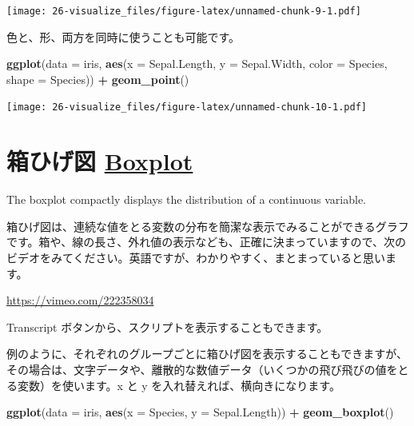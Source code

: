 \documentclass[
  xelatex, ja=standard]{bxjsbook}
\newenvironment{Shaded}{\begin{snugshade}}{\end{snugshade}}
\newcommand{\AttributeTok}[1]{\textcolor[rgb]{0.13,0.29,0.53}{#1}}
\newcommand{\FunctionTok}[1]{\textcolor[rgb]{0.13,0.29,0.53}{\textbf{#1}}}
\newcommand{\NormalTok}[1]{#1}
\newcommand{\SpecialCharTok}[1]{\textcolor[rgb]{0.81,0.36,0.00}{\textbf{#1}}}
\theoremstyle{definition}
\theoremstyle{definition}
\theoremstyle{definition}
\theoremstyle{definition}
\theoremstyle{remark}
\begin{document}
\texttt{[image: 26-visualize\_files/figure-latex/unnamed-chunk-9-1.pdf]}

色と、形、両方を同時に使うことも可能です。

\begin{Shaded}
\begin{Highlighting}[]
\FunctionTok{ggplot}\NormalTok{(}\AttributeTok{data =}\NormalTok{ iris, }\FunctionTok{aes}\NormalTok{(}\AttributeTok{x =}\NormalTok{ Sepal.Length, }\AttributeTok{y =}\NormalTok{ Sepal.Width, }\AttributeTok{color =}\NormalTok{ Species, }\AttributeTok{shape =}\NormalTok{ Species)) }\SpecialCharTok{+}
  \FunctionTok{geom\_point}\NormalTok{()}
\end{Highlighting}
\end{Shaded}

\texttt{[image: 26-visualize\_files/figure-latex/unnamed-chunk-10-1.pdf]}

\hypertarget{ux7bb1ux3072ux3052ux56f3-boxplot}{%
\section{\texorpdfstring{箱ひげ図 \href{https://ggplot2.tidyverse.org/reference/geom_boxplot.html}{Boxplot}}{箱ひげ図 Boxplot}}\label{ux7bb1ux3072ux3052ux56f3-boxplot}}

The boxplot compactly displays the distribution of a continuous variable.

箱ひげ図は、連続な値をとる変数の分布を簡潔な表示でみることができるグラフです。箱や、線の長さ、外れ値の表示なども、正確に決まっていますので、次のビデオをみてください。英語ですが、わかりやすく、まとまっていると思います。

\url{https://vimeo.com/222358034}

Transcript ボタンから、スクリプトを表示することもできます。

例のように、それぞれのグループごとに箱ひげ図を表示することもできますが、その場合は、文字データや、離散的な数値データ（いくつかの飛び飛びの値をとる変数）を使います。x と y を入れ替えれば、横向きになります。

\begin{Shaded}
\begin{Highlighting}[]
\FunctionTok{ggplot}\NormalTok{(}\AttributeTok{data =}\NormalTok{ iris, }\FunctionTok{aes}\NormalTok{(}\AttributeTok{x =}\NormalTok{ Species, }\AttributeTok{y =}\NormalTok{ Sepal.Length)) }\SpecialCharTok{+}
  \FunctionTok{geom\_boxplot}\NormalTok{()}
\end{Highlighting}
\end{Shaded}
\end{document}
